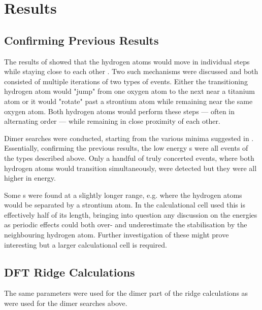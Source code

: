 \section{Results}
\label{sec:perovskites-results}


\subsection{Confirming Previous Results}
The results of \cite{double-defect-2011} showed that the hydrogen atoms would move in individual steps while staying close to each other .
Two such mechanisms were discussed and both consisted of multiple iterations of two types of events.
Either the transitioning hydrogen atom would "jump" from one oxygen atom to the next near a titanium atom or it would "rotate" past a strontium atom while remaining near the same oxygen atom.
Both hydrogen atoms would perform these steps --- often in alternating order --- while remaining in close proximity of each other.

Dimer  searches were conducted, starting from the various minima suggested in \cite{double-defect-2011}.
Essentially, confirming the previous results, the low energy s were all events of the types described above.
Only a handful of truly concerted events, where both hydrogen atoms would transition simultaneously, were detected but they were all higher in energy.

Some s were found at a slightly longer range, e.g. where the hydrogen atoms would be separated by a strontium atom.
In the calculational cell used this is effectively half of its length, bringing into question any discussion on the energies as periodic effects could both over- and underestimate the stabilisation by the neighbouring hydrogen atom.
Further investigation of these might prove interesting but a larger calculational cell is required.

\subsection{DFT Ridge Calculations}
The same parameters were used for the dimer part of the ridge calculations as were used for the dimer searches above.

